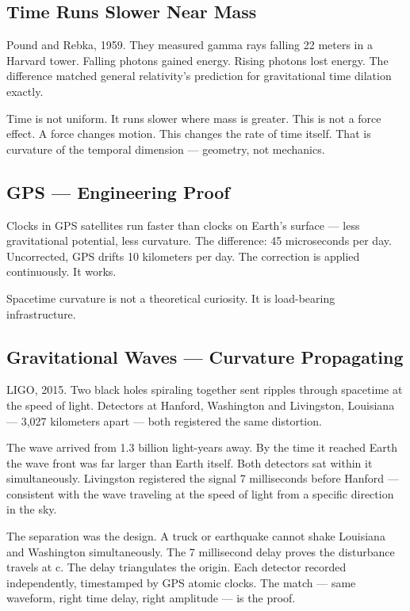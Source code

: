 \documentclass[11pt]{article}
\begin{document}
\subsection{Time Runs Slower Near Mass}
\label{sec:org50e25ec}

Pound and Rebka, 1959. They measured gamma rays falling 22 meters in a Harvard
tower. Falling photons gained energy. Rising photons lost energy. The difference
matched general relativity's prediction for gravitational time dilation exactly.

Time is not uniform. It runs slower where mass is greater. This is not a force
effect. A force changes motion. This changes the rate of time itself. That is
curvature of the temporal dimension — geometry, not mechanics.

\subsection{GPS — Engineering Proof}
\label{sec:org7d4cf7a}

Clocks in GPS satellites run faster than clocks on Earth's surface — less
gravitational potential, less curvature. The difference: 45 microseconds per
day. Uncorrected, GPS drifts 10 kilometers per day. The correction is applied
continuously. It works.

Spacetime curvature is not a theoretical curiosity. It is load-bearing
infrastructure.

\subsection{Gravitational Waves — Curvature Propagating}
\label{sec:org8f3304d}

LIGO, 2015. Two black holes spiraling together sent ripples through spacetime at
the speed of light. Detectors at Hanford, Washington and Livingston, Louisiana —
3,027 kilometers apart — both registered the same distortion.

The wave arrived from 1.3 billion light-years away. By the time it reached Earth
the wave front was far larger than Earth itself. Both detectors sat within it
simultaneously. Livingston registered the signal 7 milliseconds before Hanford —
consistent with the wave traveling at the speed of light from a specific
direction in the sky.

The separation was the design. A truck or earthquake cannot shake Louisiana and
Washington simultaneously. The 7 millisecond delay proves the disturbance travels
at c. The delay triangulates the origin. Each detector recorded independently,
timestamped by GPS atomic clocks. The match — same waveform, right time delay,
right amplitude — is the proof.
\end{document}
